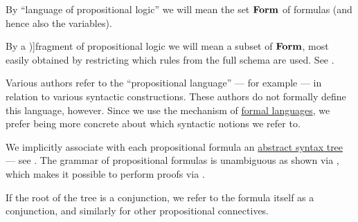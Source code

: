 \begin{definition}
\begin{thmenum}
     By \enquote{language of propositional logic} we will mean the set \( \op*{Form} \) of formulas (and hence also the variables).

     By a \term[en=fragment (\cite[49]{Mimram2020})]{fragment} of propositional logic we will mean a subset of \( \op*{Form} \), most easily obtained by restricting which rules from the full schema are used. See .
  \end{thmenum}
\end{definition}
\begin{comments}
  \item Various authors refer to the \enquote{propositional language} --- for example  --- in relation to various syntactic constructions. These authors do not formally define this language, however. Since we use the mechanism of \hyperref[def:formal_language]{formal languages}, we prefer being more concrete about which syntactic notions we refer to.

  \item We implicitly associate with each propositional formula an \hyperref[con:abstract_syntax_tree]{abstract syntax tree} --- see . The grammar of propositional formulas is unambiguous as shown via , which makes it possible to perform proofs via .

  \item If the root of the tree is a conjunction, we refer to the formula itself as a conjunction, and similarly for other propositional connectives.
\end{comments}


